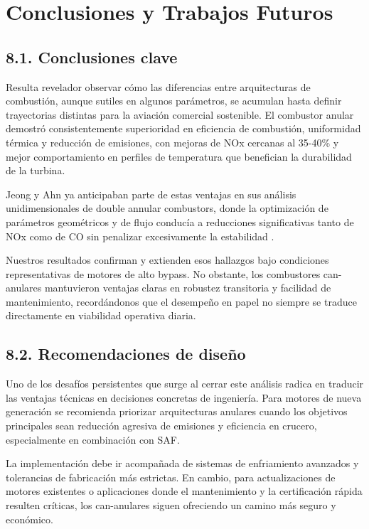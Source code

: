 \section{Conclusiones y Trabajos Futuros}

\subsection{8.1. Conclusiones clave}

Resulta revelador observar cómo las diferencias entre arquitecturas de combustión, aunque sutiles en algunos parámetros, se acumulan hasta definir trayectorias distintas para la aviación comercial sostenible. El combustor anular demostró consistentemente superioridad en eficiencia de combustión, uniformidad térmica y reducción de emisiones, con mejoras de NOx cercanas al 35-40\% y mejor comportamiento en perfiles de temperatura que benefician la durabilidad de la turbina.

Jeong y Ahn ya anticipaban parte de estas ventajas en sus análisis unidimensionales de double annular combustors, donde la optimización de parámetros geométricos y de flujo conducía a reducciones significativas tanto de NOx como de CO sin penalizar excesivamente la estabilidad \cite{Jeong2021}. 

Nuestros resultados confirman y extienden esos hallazgos bajo condiciones representativas de motores de alto bypass. No obstante, los combustores can-anulares mantuvieron ventajas claras en robustez transitoria y facilidad de mantenimiento, recordándonos que el desempeño en papel no siempre se traduce directamente en viabilidad operativa diaria.

\subsection{8.2. Recomendaciones de diseño}

Uno de los desafíos persistentes que surge al cerrar este análisis radica en traducir las ventajas técnicas en decisiones concretas de ingeniería. Para motores de nueva generación se recomienda priorizar arquitecturas anulares cuando los objetivos principales sean reducción agresiva de emisiones y eficiencia en crucero, especialmente en combinación con SAF. 

La implementación debe ir acompañada de sistemas de enfriamiento avanzados y tolerancias de fabricación más estrictas. En cambio, para actualizaciones de motores existentes o aplicaciones donde el mantenimiento y la certificación rápida resulten críticas, los can-anulares siguen ofreciendo un camino más seguro y económico.


